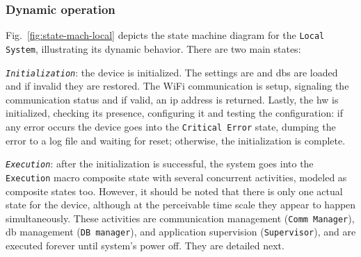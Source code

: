 \subsubsection{Dynamic operation}
\label{sec:dyn-oper}
Fig.~\ref{fig:state-mach-local} depicts the state machine diagram for the
\texttt{Local System}, illustrating its dynamic behavior. There are two main
states:
\begin{item-c}
\item \emph{\texttt{Initialization}}: the device is initialized. The settings are
  and \gls{db}s are loaded and if invalid they are restored. The WiFi
  communication is setup, signaling the communication status and if valid, an
  \gls{ip} address is returned. Lastly, the \gls{hw} is initialized, checking
  its presence, configuring it and testing the configuration: if any error
  occurs the device goes into the \texttt{Critical Error} state, dumping the
  error to a log file and waiting for reset; otherwise, the initialization is
  complete.
\item \emph{\texttt{Execution}}: after the initialization is successful, the
  system goes into the \texttt{Execution} macro composite state with several
  concurrent activities, modeled as composite states too. However, it should be
  noted that there is only one actual state for the device, although at the
  perceivable time scale they appear to happen simultaneously. These activities
  are communication management (\texttt{Comm Manager}), \gls{db} management
  (\texttt{DB manager}), and application supervision (\texttt{Supervisor}), and
  are executed forever until system's power off. They are detailed next.
\end{item-c}
%
